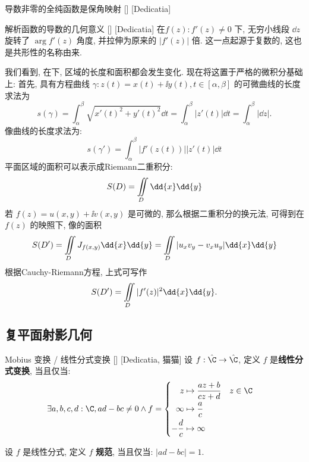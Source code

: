\documentclass[UTF8]{ctexart}
\begin{document}
        \begin{thm}
            [UUID]
            {导数非零的全纯函数是保角映射}
            []
            [Dedicatia]

        \end{thm}

        \begin{crl}
            [UUID]
            {解析函数的导数的几何意义}
            []
            [Dedicatia]
            在\ConformalMapping  \(f(z): f'(z)\neq 0\) 下, 无穷小线段 \(\dd{z}\) 旋转了 \(\arg f'(z)\) 角度, 并拉伸为原来的 \(|f'(z)|\) 倍. 这一点起源于复数的\AngularForm, 这也是共形性的名称由来. 
        \end{crl}

        我们看到, 在\ConformalMapping 下, 区域的长度和面积都会发生变化. 现在将这置于严格的微积分基础上: 首先, 具有方程曲线 \(\gamma:z(t)=x(t)+\ii y(t), t\in[\alpha,\beta]\) 的可微曲线的长度求法为
        \[s(\gamma)=\int_\alpha^\beta\sqrt{x'(t)^2+y'(t)^2}\dd{t}=\int_{\alpha}^{\beta}|z'(t)|\dd{t}=\int_{\alpha}^\beta|\dd{z}|. \]
        像曲线的长度求法为: 
        \[s(\gamma')=\int_{\alpha}^{\beta}|f'(z(t))||z'(t)|\dd{t}\]
        平面区域的面积可以表示成Riemann二重积分: 
        \[S(D)=\iintop_D\dd{x}\dd{y}\]
        若 \(f(z)=u(x,y)+\ii v(x,y)\) 是可微的, 那么根据二重积分的换元法, 可得到在 \(f(z)\) 的映照下, 像的面积
        \[S(D')=\iintop_{D} J_{f(x,y)}\dd{x}\dd{y}=\iintop_{D}|u_xv_y-v_xu_y|\dd{x}\dd{y}\]
        根据Cauchy-Riemann方程, 上式可写作
        \[S(D')=\iintop_{D}|f'(z)|^2\dd{x}\dd{y}.\]
    
    \subsection{复平面射影几何}

        \begin{dfn}
            [UUID]
            {Mobius 变换 / 线性分式变换}
            []
            [Dedicatia, 猫猫]
            设 \(f:\hat{\C}\to\hat{\C}\), 定义 \(f\) 是\textbf{线性分式变换}, 当且仅当: 
            \[\exists a,b,c,d:\C, ad-bc\neq 0\land f=
            \begin{cases}
            \begin{aligned}
                z & \mapsto\frac{az+b}{cz+d} & z\in\C\\
                \infty & \mapsto\frac{a}{c}\\
                -\frac{d}{c} & \mapsto\infty
            \end{aligned}
            \end{cases}\]

            设 \(f\) 是线性分式, 定义 \(f\) \textbf{规范}, 当且仅当: \(|ad-bc|=1\). 
        \end{dfn}
\end{document}
